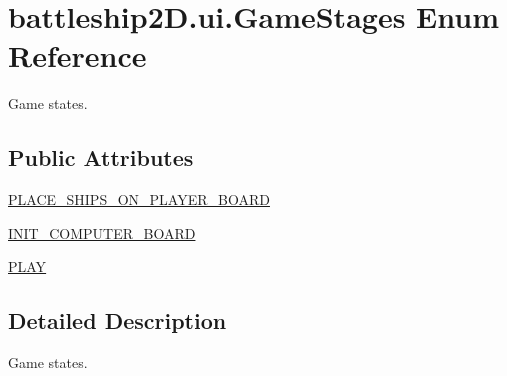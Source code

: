 \hypertarget{enumbattleship2D_1_1ui_1_1GameStages}{\section{battleship2\-D.\-ui.\-Game\-Stages Enum Reference}
\label{enumbattleship2D_1_1ui_1_1GameStages}
}


Game states.  


\subsection*{Public Attributes}
\begin{DoxyCompactItemize}
\item 
\hyperlink{enumbattleship2D_1_1ui_1_1GameStages_a2bcf38977f7ec09aef6191634775927e}{P\-L\-A\-C\-E\-\_\-\-S\-H\-I\-P\-S\-\_\-\-O\-N\-\_\-\-P\-L\-A\-Y\-E\-R\-\_\-\-B\-O\-A\-R\-D}
\item 
\hyperlink{enumbattleship2D_1_1ui_1_1GameStages_ab92fc24f3af360f81809a28bba3f06e7}{I\-N\-I\-T\-\_\-\-C\-O\-M\-P\-U\-T\-E\-R\-\_\-\-B\-O\-A\-R\-D}
\item 
\hyperlink{enumbattleship2D_1_1ui_1_1GameStages_a9b0b8145813ca60ec80459e6971c5198}{P\-L\-A\-Y}
\end{DoxyCompactItemize}


\subsection{Detailed Description}
Game states. 

